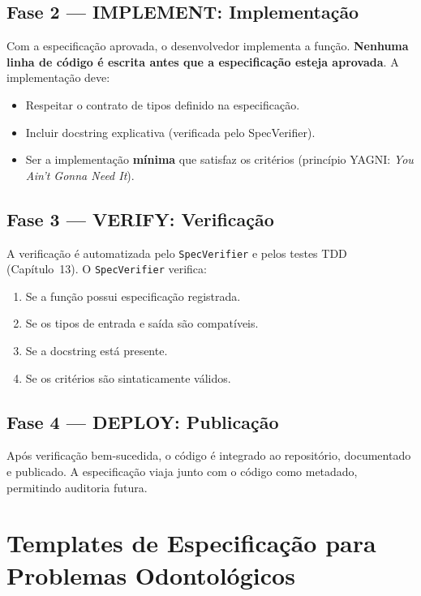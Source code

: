\subsection{Fase 2 — IMPLEMENT: Implementação}

Com a especificação aprovada, o desenvolvedor implementa a função.
\textbf{Nenhuma linha de código é escrita antes que a especificação
esteja aprovada}. A implementação deve:

\begin{itemize}
  \item Respeitar o contrato de tipos definido na especificação.
  \item Incluir docstring explicativa (verificada pelo SpecVerifier).
  \item Ser a implementação \textbf{mínima} que satisfaz os critérios
    (princípio YAGNI: \textit{You Ain't Gonna Need It}).
\end{itemize}

\subsection{Fase 3 — VERIFY: Verificação}

A verificação é automatizada pelo \texttt{SpecVerifier} e pelos testes
TDD (Capítulo~13). O \texttt{SpecVerifier} verifica:

\begin{enumerate}
  \item Se a função possui especificação registrada.
  \item Se os tipos de entrada e saída são compatíveis.
  \item Se a docstring está presente.
  \item Se os critérios são sintaticamente válidos.
\end{enumerate}

\subsection{Fase 4 — DEPLOY: Publicação}

Após verificação bem-sucedida, o código é integrado ao repositório,
documentado e publicado. A especificação viaja junto com o código como
metadado, permitindo auditoria futura.

\section{Templates de Especificação para Problemas Odontológicos}

